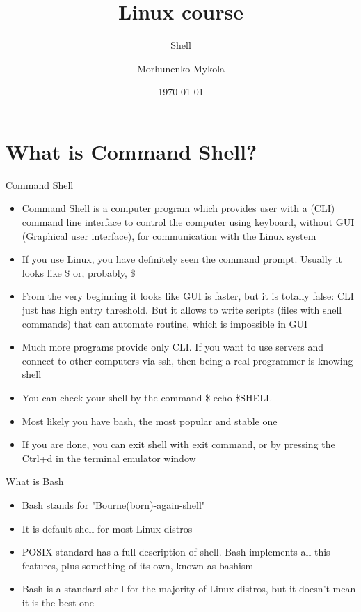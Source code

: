 \documentclass[usenames,dvipsnames,10pt,aspectratio=169]{beamer}
\title{Linux course}
\subtitle{Shell}
\date[\today]{\small\today}
\author[Morhunenko Mykola]{Morhunenko Mykola}
\institute{APPS@UCU}
\begin{document}
\begin{frame}
\titlepage
\end{frame}

\begin{frame}{\contentsname}
\tableofcontents
\end{frame}

\section{What is Command Shell?}

\begin{frame}{Command Shell}
\begin{itemize}
    \item Command Shell is a computer program which provides user with a (CLI) command line interface to control the computer using keyboard, without GUI (Graphical user interface), for communication with the Linux system
    \item If you use Linux, you have definitely seen the command prompt. Usually it looks like {\color{ucugreen}\$} or, probably, {\color{ucugreen} \$}
    \item From the very beginning it looks like GUI is faster, but it is totally false: CLI just has high entry threshold. But it allows to write scripts (files with shell commands) that can automate routine, which is impossible in GUI
    \item Much more programs provide only CLI. If you want to use servers and connect to other computers via ssh, then being a real programmer is knowing shell
    \item You can check your shell by the command {\color{ucugreen} \$ echo \$SHELL}
    \item Most likely you have {\color{ucugreen} bash}, the most popular and stable one
    \item If you are done, you can exit shell with {\color{ucugreen} exit} command, or by pressing the {\color{ucugreen}Ctrl+d} in the terminal emulator window
\end{itemize}
\end{frame}

\begin{frame}{What is Bash}
\begin{itemize}
    \item Bash stands for "Bourne(born)-again-shell"
    \item It is default shell for most Linux distros
    \item POSIX standard has a full description of shell. Bash implements all this features, plus something of its own, known as {\color{ucugreen} bashism}
    \item Bash is a standard shell for the majority of Linux distros, but it doesn't mean it is the best one
\end{itemize}
\end{frame}
\end{document}
